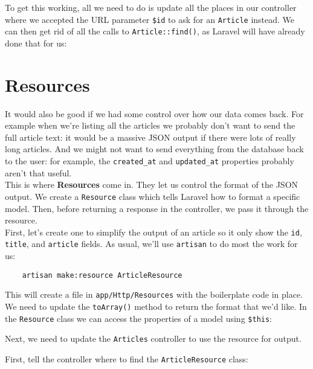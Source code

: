 To get this working, all we need to do is update all the places in our controller where we accepted the URL parameter \texttt{\$id} to ask for an \texttt{Article} instead. We can then get rid of all the calls to \texttt{Article::find()}, as Laravel will have already done that for us:




\section{Resources}

It would also be good if we had some control over how our data comes back. For example when we're listing all the articles we probably don't want to send the full article text: it would be a massive JSON output if there were lots of really long articles. And we might not want to send everything from the database back to the user: for example, the \texttt{created\_at} and \texttt{updated\_at} properties probably aren't that useful.
\\

This is where \textbf{Resources} come in. They let us control the format of the JSON output. We create a \texttt{Resource} class which tells Laravel how to format a specific model. Then, before returning a response in the controller, we pass it through the resource.
\\

First, let's create one to simplify the output of an article so it only show the \texttt{id}, \texttt{title}, and \texttt{article} fields. As usual, we'll use \texttt{artisan} to do most the work for us:

\begin{verbatim}
    artisan make:resource ArticleResource
\end{verbatim}

This will create a file in \texttt{app/Http/Resources} with the boilerplate code in place. We need to update the \texttt{toArray()} method to return the format that we'd like. In the \texttt{Resource} class we can access the properties of a model using \texttt{\$this}:


Next, we need to update the \texttt{Articles} controller to use the resource for output.

\pagebreak

First, tell the controller where to find the \texttt{ArticleResource} class:

